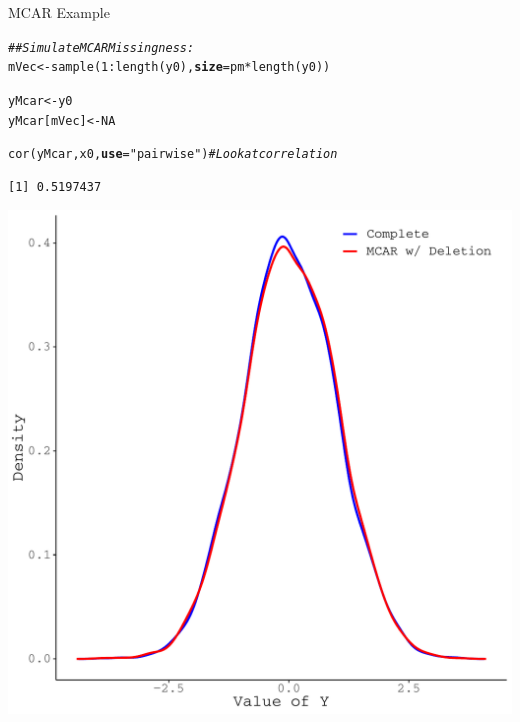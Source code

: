 \documentclass{beamer}\usepackage[]{graphicx}\usepackage[]{color}
\makeatletter
\newcommand{\hlnum}[1]{\textcolor[rgb]{0.69,0.494,0}{#1}}%
\newcommand{\hlstr}[1]{\textcolor[rgb]{0.749,0.012,0.012}{#1}}%
\newcommand{\hlcom}[1]{\textcolor[rgb]{0.514,0.506,0.514}{\textit{#1}}}%
\newcommand{\hlopt}[1]{\textcolor[rgb]{0,0,0}{#1}}%
\newcommand{\hlstd}[1]{\textcolor[rgb]{0,0,0}{#1}}%
\newcommand{\hlkwb}[1]{\textcolor[rgb]{0,0.341,0.682}{#1}}%
\newcommand{\hlkwc}[1]{\textcolor[rgb]{0,0,0}{\textbf{#1}}}%
\newcommand{\hlkwd}[1]{\textcolor[rgb]{0.004,0.004,0.506}{#1}}%
\newenvironment{kframe}{%
 \def\at@end@of@kframe{}%
 \ifinner\ifhmode%
  \def\at@end@of@kframe{\end{minipage}}%
  \begin{minipage}{\columnwidth}%
 \fi\fi%
 \def\FrameCommand##1{\hskip\@totalleftmargin \hskip-\fboxsep
 \colorbox{shadecolor}{##1}\hskip-\fboxsep
     \hskip-\linewidth \hskip-\@totalleftmargin \hskip\columnwidth}%
 \MakeFramed {\advance\hsize-\width
   \@totalleftmargin\z@ \linewidth\hsize
   \@setminipage}}%
 {\par\unskip\endMakeFramed%
 \at@end@of@kframe}
\newenvironment{knitrout}{}{} %
\makeatother
\begin{document}
\begin{frame}{MCAR Example}
  
\begin{knitrout}\footnotesize
{}\color{fgcolor}\begin{kframe}
\begin{alltt}
\hlcom{## Simulate MCAR Missingness:}
\hlstd{mVec} \hlkwb{<-} \hlkwd{sample}\hlstd{(}\hlnum{1} \hlopt{:} \hlkwd{length}\hlstd{(y0),} \hlkwc{size} \hlstd{= pm} \hlopt{*} \hlkwd{length}\hlstd{(y0))}

\hlstd{yMcar}       \hlkwb{<-} \hlstd{y0}
\hlstd{yMcar[mVec]} \hlkwb{<-} \hlnum{NA}

\hlkwd{cor}\hlstd{(yMcar, x0,} \hlkwc{use} \hlstd{=} \hlstr{"pairwise"}\hlstd{)} \hlcom{# Look at correlation}
\end{alltt}
\begin{verbatim}
[1] 0.5197437
\end{verbatim}
\end{kframe}
\end{knitrout}

\pagebreak

\begin{knitrout}\footnotesize
{}\color{fgcolor}

{\centering \includegraphics[width=0.65\linewidth]{figure/intro-unnamed-chunk-12-1} 

}


\end{knitrout}

\end{frame}

\end{document}
